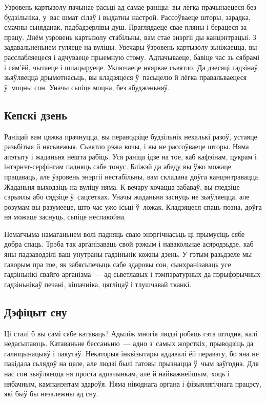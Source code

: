 Узровень картызолу пачынае расьці ад самае раніцы: вы лёгка прачынаецеся без будзільніка, у~вас шмат сілаў і выдатны настрой. Рассоўваеце шторы, зарадка, смачны сьняданак, падбадзёрлівы душ. Праглядаеце свае пляны і берацеся за працу. Днём узровень картызолу стабільны, вам стае энэргіі ды канцэнтрацыі. З задавальненьнем гуляеце на вуліцы. Увечары ўзровень картызолу зьніжаецца, вы расслабляецеся і адчуваеце прыемную стому. Адпачываеце, бавіце час зь сябрамі і сям'ёй, чытаеце і шпацыруеце. Уключаеце няяркае сьвятло. Да дзесяці гадзінаў зьяўляецца дрымотнасьць, вы кладзяцеся ў~пасьцелю й лёгка правальваецеся ў~моцны сон. Уначы сьпіце моцна, без абуджэньняў.

\subsection*{Кепскі дзень}

Раніцай вам цяжка прачнуцца, вы пераводзіце будзільнік некалькі разоў, устаяце разьбітыя й нясьвежыя. Сьвятло рэжа вочы, і вы не рассоўваеце шторы. Няма апэтыту і жаданьня нешта рабіць. Уся раніца ідзе на тое, каб кафэінам, цукрам і інтэрнэт-серфінгам падняць сабе тонус. Бліжэй да абеду вы ўжо можаце працаваць, але ўзровень энэргіі нестабільны, вам складана доўга канцэнтравацца. Жаданьня выходзіць на вуліцу няма. К вечару хочацца забаваў, вы гледзіце сэрыялы або сядзіце ў~сацсетках. Уначы жаданьня заснуць не зьяўляецца, але розумам вы разумееце, што час ужо ісьці ў~ложак. Кладзяцеся спаць позна, доўга ня можаце заснуць, сьпіце неспакойна.

Немагчыма намаганьнем волі падняць сваю энэргічнасьць ці прымусіць сябе добра спаць. Трэба так арганізаваць свой рэжым і навакольнае асяродзьдзе, каб яны падзаводзілі ваш унутраны гадзіньнік кожны дзень. У гэтым разьдзеле мы гаворым пра тое, як забясьпечыць сабе здаровы сон, сынхранізаваць усе гадзіньнікі свайго арганізма~--- ад сьветлавых і тэмпэратурных да пэрыфэрычных гадзіньнікаў печані, кішачніка, цягліцаў і тлушчавай тканкі.

\subsection*{Дэфіцыт сну}

Ці сталі б вы самі сябе катаваць? Адыліж многія людзі робяць гэта штодня, калі недасыпаюць. Катаваньне бессаньню~--- адно з~самых жорсткіх, прыводзіць да галюцынацыяў і пакутаў. Некаторыя інквізытары аддавалі ёй перавагу, бо яна не пакідала сьлядоў на целе, але людзі былі гатовы прызнацца ў~чым заўгодна. Для нас сон зьяўляецца ня проста адпачынкам, але й найважнейшым, хоць і нябачным, кампанэнтам здароўя. Няма ніводнага органа і фізыялягічнага працэсу, які быў бы незалежны ад сну. 

